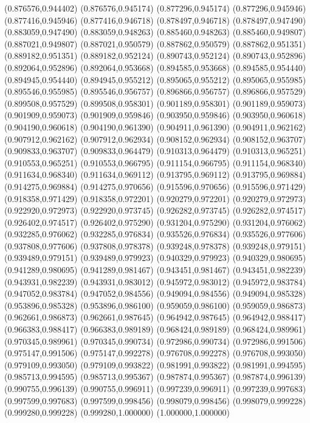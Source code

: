 (0.876576,0.944402)
(0.876576,0.945174)
(0.877296,0.945174)
(0.877296,0.945946)
(0.877416,0.945946)
(0.877416,0.946718)
(0.878497,0.946718)
(0.878497,0.947490)
(0.883059,0.947490)
(0.883059,0.948263)
(0.885460,0.948263)
(0.885460,0.949807)
(0.887021,0.949807)
(0.887021,0.950579)
(0.887862,0.950579)
(0.887862,0.951351)
(0.889182,0.951351)
(0.889182,0.952124)
(0.890743,0.952124)
(0.890743,0.952896)
(0.892064,0.952896)
(0.892064,0.953668)
(0.894585,0.953668)
(0.894585,0.954440)
(0.894945,0.954440)
(0.894945,0.955212)
(0.895065,0.955212)
(0.895065,0.955985)
(0.895546,0.955985)
(0.895546,0.956757)
(0.896866,0.956757)
(0.896866,0.957529)
(0.899508,0.957529)
(0.899508,0.958301)
(0.901189,0.958301)
(0.901189,0.959073)
(0.901909,0.959073)
(0.901909,0.959846)
(0.903950,0.959846)
(0.903950,0.960618)
(0.904190,0.960618)
(0.904190,0.961390)
(0.904911,0.961390)
(0.904911,0.962162)
(0.907912,0.962162)
(0.907912,0.962934)
(0.908152,0.962934)
(0.908152,0.963707)
(0.909833,0.963707)
(0.909833,0.964479)
(0.910313,0.964479)
(0.910313,0.965251)
(0.910553,0.965251)
(0.910553,0.966795)
(0.911154,0.966795)
(0.911154,0.968340)
(0.911634,0.968340)
(0.911634,0.969112)
(0.913795,0.969112)
(0.913795,0.969884)
(0.914275,0.969884)
(0.914275,0.970656)
(0.915596,0.970656)
(0.915596,0.971429)
(0.918358,0.971429)
(0.918358,0.972201)
(0.920279,0.972201)
(0.920279,0.972973)
(0.922920,0.972973)
(0.922920,0.973745)
(0.926282,0.973745)
(0.926282,0.974517)
(0.926402,0.974517)
(0.926402,0.975290)
(0.931204,0.975290)
(0.931204,0.976062)
(0.932285,0.976062)
(0.932285,0.976834)
(0.935526,0.976834)
(0.935526,0.977606)
(0.937808,0.977606)
(0.937808,0.978378)
(0.939248,0.978378)
(0.939248,0.979151)
(0.939489,0.979151)
(0.939489,0.979923)
(0.940329,0.979923)
(0.940329,0.980695)
(0.941289,0.980695)
(0.941289,0.981467)
(0.943451,0.981467)
(0.943451,0.982239)
(0.943931,0.982239)
(0.943931,0.983012)
(0.945972,0.983012)
(0.945972,0.983784)
(0.947052,0.983784)
(0.947052,0.984556)
(0.949094,0.984556)
(0.949094,0.985328)
(0.953896,0.985328)
(0.953896,0.986100)
(0.959059,0.986100)
(0.959059,0.986873)
(0.962661,0.986873)
(0.962661,0.987645)
(0.964942,0.987645)
(0.964942,0.988417)
(0.966383,0.988417)
(0.966383,0.989189)
(0.968424,0.989189)
(0.968424,0.989961)
(0.970345,0.989961)
(0.970345,0.990734)
(0.972986,0.990734)
(0.972986,0.991506)
(0.975147,0.991506)
(0.975147,0.992278)
(0.976708,0.992278)
(0.976708,0.993050)
(0.979109,0.993050)
(0.979109,0.993822)
(0.981991,0.993822)
(0.981991,0.994595)
(0.985713,0.994595)
(0.985713,0.995367)
(0.987874,0.995367)
(0.987874,0.996139)
(0.990755,0.996139)
(0.990755,0.996911)
(0.997239,0.996911)
(0.997239,0.997683)
(0.997599,0.997683)
(0.997599,0.998456)
(0.998079,0.998456)
(0.998079,0.999228)
(0.999280,0.999228)
(0.999280,1.000000)
(1.000000,1.000000)
